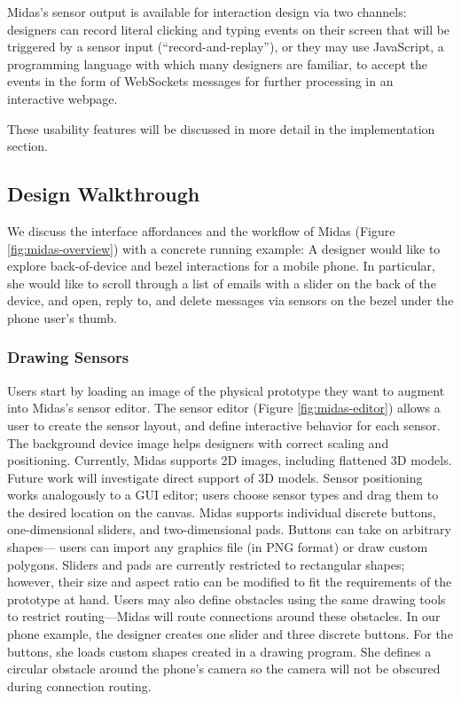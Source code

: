 Midas's sensor output is available for interaction design via two channels: designers can record literal clicking and typing events on their screen that will be triggered by a sensor input (``record-and-replay''), or they may use JavaScript, a programming language with which many designers are familiar, to accept the events in the form of WebSockets messages for further processing in an interactive webpage.

These usability features will be discussed in more detail in the implementation section.

    \subsection{Design Walkthrough}
    
    We discuss the interface affordances and the
workflow of Midas (Figure \ref{fig:midas-overview}) with a concrete running example:
A designer would like to explore back-of-device and
bezel interactions for a mobile phone. In particular, she
would like to scroll through a list of emails with a slider on
the back of the device, and open, reply to, and delete messages
via sensors on the bezel under the phone user's thumb.

        \subsubsection{Drawing Sensors}
Users start by loading an image of the physical prototype
they want to augment into Midas's sensor editor. The sensor
editor (Figure \ref{fig:midas-editor}) allows a user to create the sensor layout, and
define interactive behavior for each sensor. The background
device image helps designers with correct scaling and positioning.
Currently, Midas supports 2D images, including
flattened 3D models. Future work will investigate direct support
of 3D models. Sensor positioning works analogously
to a GUI editor; users choose sensor types and drag them to the desired location on the canvas. Midas supports individual
discrete buttons, one-dimensional sliders, and two-dimensional
pads. Buttons can take on arbitrary shapes---
users can import any graphics file (in PNG format) or draw
custom polygons. Sliders and pads are currently restricted
to rectangular shapes; however, their size and aspect ratio
can be modified to fit the requirements of the prototype at
hand. Users may also define obstacles using the same drawing
tools to restrict routing---Midas will route connections
around these obstacles.
In our phone example, the designer creates one slider and
three discrete buttons. For the buttons, she loads custom
shapes created in a drawing program. She defines a circular
obstacle around the phone's camera so the camera will
not be obscured during connection routing.

